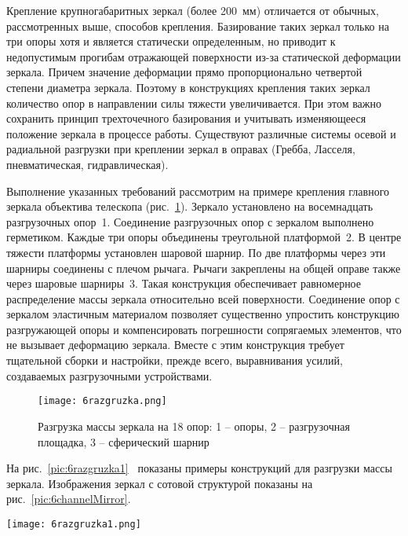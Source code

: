 Крепление крупногабаритных зеркал (более 200~мм) отличается от обычных, рассмотренных выше, способов крепления. 
Базирование таких зеркал только на три опоры хотя и является статически определенным, но приводит к недопустимым прогибам отражающей поверхности из-за статической деформации зеркала. 
Причем значение деформации прямо пропорционально четвертой степени диаметра зеркала. 
Поэтому в конструкциях крепления таких зеркал количество опор в направлении силы тяжести увеличивается. 
При этом важно сохранить принцип трехточечного базирования и учитывать изменяющееся положение зеркала в процессе работы. Существуют различные системы осевой и радиальной разгрузки при креплении зеркал в оправах (Гребба, Ласселя, пневматическая, гидравлическая).

Выполнение указанных требований рассмотрим на примере крепления главного зеркала объектива телескопа (рис.~\ref{pic:6razgruzka}). Зеркало установлено на восемнадцать разгрузочных опор~1. 
Соединение разгрузочных опор с зеркалом выполнено герметиком. 
Каждые три опоры объединены треугольной платформой~2. 
В центре тяжести платформы установлен шаровой шарнир. 
По две платформы через эти шарниры соединены с плечом рычага. 
Рычаги закреплены на общей оправе также через шаровые шарниры~3. 
Такая конструкция обеспечивает равномерное распределение массы зеркала относительно всей поверхности. 
Соединение опор с зеркалом эластичным материалом позволяет существенно упростить конструкцию разгружающей опоры и компенсировать погрешности сопрягаемых элементов, что не вызывает деформацию зеркала. 
Вместе с этим конструкция требует тщательной сборки и настройки, прежде всего, выравнивания усилий, создаваемых разгрузочными устройствами.

\begin{figure}[h!]
	\texttt{[image: 6razgruzka.png]}
	\caption[Разгрузка массы зеркала на 18 опор]{ Разгрузка массы зеркала на 18 опор: 1 -- опоры, 2 -- разгрузочная площадка, 3 -- сферический шарнир }
	\label{pic:6razgruzka}
\end{figure}

На рис.~\ref{pic:6razgruzka1}~ показаны примеры конструкций для разгрузки массы зеркала. Изображения зеркал с сотовой структурой показаны на рис.~\ref{pic:6channelMirror}.

\begin{figure*}[h!]
	\texttt{[image: 6razgruzka1.png]}
	\caption{ Пример конструкций для разгрузки массы зеркала }
	\label{pic:6razgruzka1}
\end{figure*}

